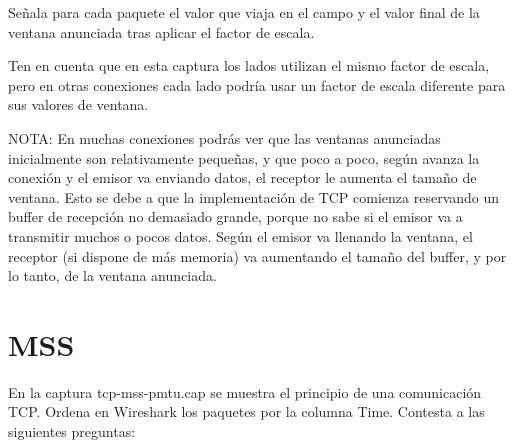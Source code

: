 \documentclass[12pt, a4paper]{report}
\begin{document}
Señala para cada paquete el valor que viaja en el campo y el valor final de la ventana anunciada tras aplicar el factor de escala.

Ten en cuenta que en esta captura los lados utilizan el mismo factor de escala, pero en otras conexiones cada lado podría usar un factor de escala diferente para sus valores de ventana.

NOTA: En muchas conexiones podrás ver que las ventanas anunciadas inicialmente son relativamente pequeñas, y que poco a poco, según avanza la conexión y el emisor va enviando datos, el receptor le aumenta el tamaño de ventana. Esto se debe a que la implementación de TCP comienza reservando un buffer de recepción no demasiado grande, porque no sabe si el emisor va a transmitir muchos o pocos datos. Según el emisor va llenando la ventana, el receptor (si dispone de más memoria) va aumentando el tamaño del buffer, y por lo tanto, de la ventana anunciada.

\section{MSS}
En la captura tcp-mss-pmtu.cap se muestra el principio de una comunicación TCP. Ordena en Wireshark los paquetes por la columna Time. Contesta a las siguientes preguntas:
\end{document}

